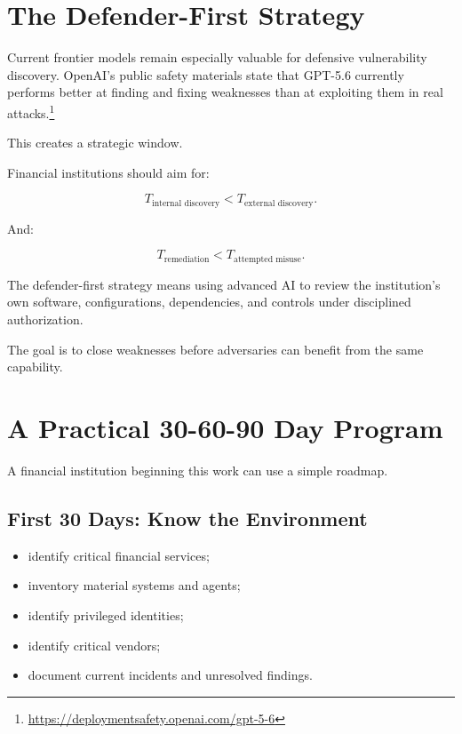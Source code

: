 \section{The Defender-First Strategy}

Current frontier models remain especially valuable for defensive vulnerability discovery. OpenAI's public safety materials state that GPT-5.6 currently performs better at finding and fixing weaknesses than at exploiting them in real attacks.\footnote{\url{https://deploymentsafety.openai.com/gpt-5-6}}

This creates a strategic window.

Financial institutions should aim for:

\begin{equation}
T_{\text{internal discovery}}
<
T_{\text{external discovery}}.
\end{equation}

And:

\begin{equation}
T_{\text{remediation}}
<
T_{\text{attempted misuse}}.
\end{equation}

The defender-first strategy means using advanced AI to review the institution's own software, configurations, dependencies, and controls under disciplined authorization.

The goal is to close weaknesses before adversaries can benefit from the same capability.

\section{A Practical 30-60-90 Day Program}

A financial institution beginning this work can use a simple roadmap.

\subsection{First 30 Days: Know the Environment}

\begin{itemize}
    \item identify critical financial services;
    \item inventory material systems and agents;
    \item identify privileged identities;
    \item identify critical vendors;
    \item document current incidents and unresolved findings.
\end{itemize}

